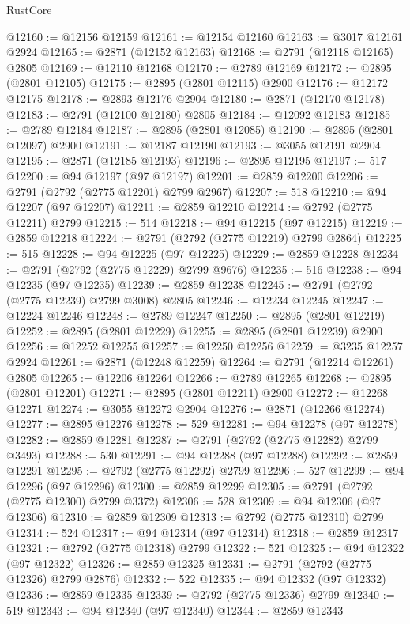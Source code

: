 \begin{lexlean}{RustCore}
\begin{coremodule}
@12160 := @12156 @12159
@12161 := @12154 @12160
@12163 := @3017 @12161 @2924
@12165 := @2871 (@12152 @12163)
@12168 := @2791 (@12118 @12165) @2805
@12169 := @12110 @12168
@12170 := @2789 @12169
@12172 := @2895 (@2801 @12105)
@12175 := @2895 (@2801 @12115) @2900
@12176 := @12172 @12175
@12178 := @2893 @12176 @2904
@12180 := @2871 (@12170 @12178)
@12183 := @2791 (@12100 @12180) @2805
@12184 := @12092 @12183
@12185 := @2789 @12184
@12187 := @2895 (@2801 @12085)
@12190 := @2895 (@2801 @12097) @2900
@12191 := @12187 @12190
@12193 := @3055 @12191 @2904
@12195 := @2871 (@12185 @12193)
@12196 := @2895 @12195
@12197 := 517
@12200 := @94 @12197 (@97 @12197)
@12201 := @2859 @12200
@12206 := @2791 (@2792 (@2775 @12201) @2799 @2967)
@12207 := 518
@12210 := @94 @12207 (@97 @12207)
@12211 := @2859 @12210
@12214 := @2792 (@2775 @12211) @2799
@12215 := 514
@12218 := @94 @12215 (@97 @12215)
@12219 := @2859 @12218
@12224 := @2791 (@2792 (@2775 @12219) @2799 @2864)
@12225 := 515
@12228 := @94 @12225 (@97 @12225)
@12229 := @2859 @12228
@12234 := @2791 (@2792 (@2775 @12229) @2799 @9676)
@12235 := 516
@12238 := @94 @12235 (@97 @12235)
@12239 := @2859 @12238
@12245 := @2791 (@2792 (@2775 @12239) @2799 @3008) @2805
@12246 := @12234 @12245
@12247 := @12224 @12246
@12248 := @2789 @12247
@12250 := @2895 (@2801 @12219)
@12252 := @2895 (@2801 @12229)
@12255 := @2895 (@2801 @12239) @2900
@12256 := @12252 @12255
@12257 := @12250 @12256
@12259 := @3235 @12257 @2924
@12261 := @2871 (@12248 @12259)
@12264 := @2791 (@12214 @12261) @2805
@12265 := @12206 @12264
@12266 := @2789 @12265
@12268 := @2895 (@2801 @12201)
@12271 := @2895 (@2801 @12211) @2900
@12272 := @12268 @12271
@12274 := @3055 @12272 @2904
@12276 := @2871 (@12266 @12274)
@12277 := @2895 @12276
@12278 := 529
@12281 := @94 @12278 (@97 @12278)
@12282 := @2859 @12281
@12287 := @2791 (@2792 (@2775 @12282) @2799 @3493)
@12288 := 530
@12291 := @94 @12288 (@97 @12288)
@12292 := @2859 @12291
@12295 := @2792 (@2775 @12292) @2799
@12296 := 527
@12299 := @94 @12296 (@97 @12296)
@12300 := @2859 @12299
@12305 := @2791 (@2792 (@2775 @12300) @2799 @3372)
@12306 := 528
@12309 := @94 @12306 (@97 @12306)
@12310 := @2859 @12309
@12313 := @2792 (@2775 @12310) @2799
@12314 := 524
@12317 := @94 @12314 (@97 @12314)
@12318 := @2859 @12317
@12321 := @2792 (@2775 @12318) @2799
@12322 := 521
@12325 := @94 @12322 (@97 @12322)
@12326 := @2859 @12325
@12331 := @2791 (@2792 (@2775 @12326) @2799 @2876)
@12332 := 522
@12335 := @94 @12332 (@97 @12332)
@12336 := @2859 @12335
@12339 := @2792 (@2775 @12336) @2799
@12340 := 519
@12343 := @94 @12340 (@97 @12340)
@12344 := @2859 @12343

\end{coremodule}
\end{lexlean}
